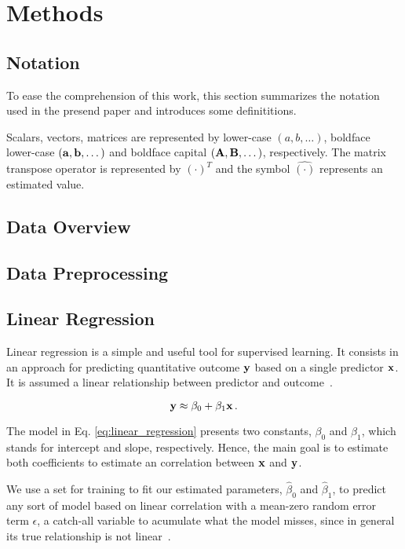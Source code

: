 \section{Methods}

\subsection{Notation}
To ease the comprehension of this work, this section summarizes the notation used in the presend paper and introduces some definititions.

Scalars, vectors, matrices are represented by lower-case $(a, b, \dots)$, boldface lower-case $({\bf a}, {\bf b}, \dots)$ and boldface capital $({\bf A}, {\bf B}, \dots)$, respectively. The matrix transpose operator is represented by $(\cdot)^T$ and the symbol $\hat{(\cdot)}$ represents an estimated value.

\subsection{Data Overview}

\subsection{Data Preprocessing}



\subsection{Linear Regression}
Linear regression is a simple and useful tool for supervised learning. It consists in an approach for predicting  quantitative outcome ${\bf y}$ based on a single predictor ${\bf x}$. It is assumed a linear relationship between predictor and outcome~\cite{James2013}.

\begin{equation}
{\bf y} \approx \beta_0 + \beta_1 {\bf x} \, . \label{eq:linear_regression}
\end{equation}

The model in Eq. \ref{eq:linear_regression} presents two constants, $\beta_0$ and $\beta_1$, which stands for intercept and slope, respectively. Hence, the main goal is to estimate both coefficients to estimate an correlation between ${\bf x}$ and ${\bf y}$.

We use a set for training to fit our estimated parameters, $\hat{\beta}_{0}$ and $\hat{\beta}_{1}$, to predict any sort of model based on linear correlation with a mean-zero random error term $\epsilon$, a catch-all variable to acumulate what the model misses, since in general its true relationship is not linear~\cite{James2013}.

